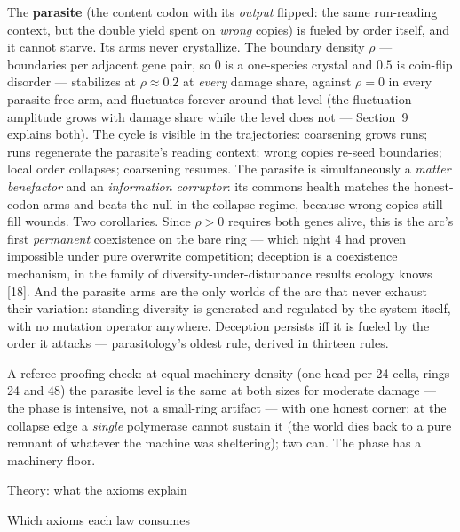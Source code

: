 The {\bf parasite} (the content codon with its {\it output}
flipped: the same run-reading context, but the double yield spent
on {\it wrong} copies) is fueled by order itself, and it cannot
starve. Its arms never crystallize. The boundary density $\rho$
--- boundaries per adjacent gene pair, so $0$ is a one-species
crystal and $0.5$ is coin-flip disorder --- stabilizes at
$\rho\approx0.2$ at {\it every} damage share, against $\rho=0$ in
every parasite-free arm, and fluctuates forever around that level
(the fluctuation amplitude grows with damage share while the level
does not --- Section~9 explains both). The cycle is visible in the
trajectories: coarsening grows runs; runs regenerate the
parasite's reading context; wrong copies re-seed boundaries; local
order collapses; coarsening resumes. The parasite is
simultaneously a {\it matter benefactor} and an {\it information
corruptor}: its commons health matches the honest-codon arms and
beats the null in the collapse regime, because wrong copies still
fill wounds. Two corollaries. Since $\rho>0$ requires both genes
alive, this is the arc's first {\it permanent} coexistence on the
bare ring --- which night 4 had proven impossible under pure
overwrite competition; deception is a coexistence mechanism, in
the family of diversity-under-disturbance results ecology knows
[18]. And the parasite arms are the only worlds of the arc that
never exhaust their variation: standing diversity is generated and
regulated by the system itself, with no mutation operator
anywhere.  Deception persists iff it is fueled by the
order it attacks --- parasitology's oldest rule, derived in
thirteen rules.

A referee-proofing check: at equal machinery density (one head per
24 cells, rings 24 and 48) the parasite level is the same at both
sizes for moderate damage --- the phase is intensive, not a
small-ring artifact --- with one honest corner: at the collapse
edge a {\it single} polymerase cannot sustain it (the world dies
back to a pure remnant of whatever the machine was sheltering);
two can. The phase has a machinery floor.

\sec Theory: what the axioms explain

\secc Which axioms each law consumes

\medskip
\noindent{}
\medskip

